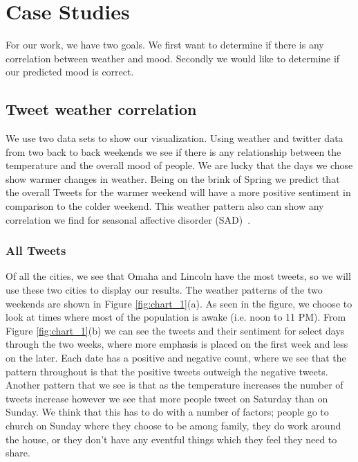 \section{Case Studies}

For our work, we have two goals. We first want to determine if there is any correlation between weather and mood. Secondly we would like to determine if our predicted mood is correct.

\begin{figure*}[htp]
  \centering
  \quad
  \quad
\caption{The comparison of weather to sentiment.}
\label{fig:chart_1}
\end{figure*}



\subsection{Tweet weather correlation}
We use two data sets to show our visualization. Using weather and twitter data from two back to back weekends we see if there is any relationship between the temperature and the overall mood of people. We are lucky that the days we chose show warmer changes in weather. Being on the brink of Spring we predict that the overall Tweets for the warmer weekend will have a more positive sentiment in comparison to the colder weekend. This weather pattern also can show any correlation we find for seasonal affective disorder (SAD)~\cite{denissen2008effects}.

\subsubsection{All Tweets}
Of all the cities, we see that Omaha and Lincoln have the most tweets, so we will use these two cities to display our results. The weather patterns of the two weekends are shown in Figure \ref{fig:chart_1}(a). As seen in the figure, we choose to look at times where most of the population is awake (i.e. noon to 11 PM). From Figure \ref{fig:chart_1}(b) we can see the tweets and their sentiment for select days through the two weeks, where more emphasis is placed on the first week and less on the later. Each date has a positive and negative count, where we see that the pattern throughout is that the positive tweets outweigh the negative tweets. Another pattern that we see is that as the temperature increases the number of tweets increase however we see that more people tweet on Saturday than on Sunday. We think that this has to do with a number of factors; people go to church on Sunday where they choose to be among family, they do work around the house, or they don't have any eventful things which they feel they need to share.


